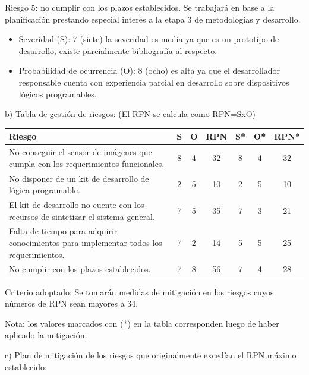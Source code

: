 \documentclass[
11pt, %
codirector, %
]{charter}
\begin{document}
Riesgo 5: no cumplir con los plazos establecidos. Se trabajará en base a la planificación prestando especial interés a la etapa 3 de metodologías y desarrollo.
\begin{itemize}
	\item Severidad (S): 7 (siete) la severidad es media ya que es un prototipo de desarrollo, existe parcialmente  bibliografía al respecto.\\
	\item Probabilidad de ocurrencia (O): 8 (ocho) es alta ya que el desarrollador responsable  cuenta con  experiencia parcial en desarrollo sobre dispositivos lógicos programables.

\end{itemize}  



b) Tabla de gestión de riesgos:      (El RPN se calcula como RPN=SxO)

\begin{table}[htpb]
\centering
\begin{tabularx}{\linewidth}{@{}|X|c|c|c|c|c|c|@{}}
\hline
\rowcolor[HTML]{C0C0C0} 
Riesgo & S & O & RPN & S* & O* & RPN* \\ \hline
No conseguir el sensor de imágenes que cumpla con los requerimientos funcionales.       & 8  &4   &32     &8    &4    &32      \\ \hline
No disponer de un kit de desarrollo de lógica programable.       &2   &5   & 10    &2    &5    &10     \\ \hline
El kit de desarrollo no cuente con los recursos de sintetizar el sistema general.       &7   &5   &35     &7    & 3   &     21 \\ \hline
Falta de tiempo para adquirir conocimientos para implementar todos los requerimientos.       &7   &2   &14     &5    & 5   & 25     \\ \hline
No cumplir con los plazos establecidos.      &7   &8   &56     &7    &4    & 28     \\ \hline
\end{tabularx}%
\end{table}

Criterio adoptado: 
Se tomarán medidas de mitigación en los riesgos cuyos números de RPN sean mayores a 34.

Nota: los valores marcados con (*) en la tabla corresponden luego de haber aplicado la mitigación.

c) Plan de mitigación de los riesgos que originalmente excedían el RPN máximo establecido:
 
\end{document}

